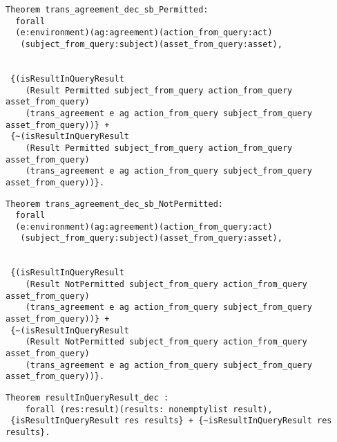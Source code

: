 \begin{lstlisting}
Theorem trans_agreement_dec_sb_Permitted:
  forall
  (e:environment)(ag:agreement)(action_from_query:act)
   (subject_from_query:subject)(asset_from_query:asset),


 {(isResultInQueryResult 
    (Result Permitted subject_from_query action_from_query asset_from_query)
    (trans_agreement e ag action_from_query subject_from_query asset_from_query))} +
 {~(isResultInQueryResult 
    (Result Permitted subject_from_query action_from_query asset_from_query)
    (trans_agreement e ag action_from_query subject_from_query asset_from_query))}.

\end{lstlisting}

\begin{lstlisting}
Theorem trans_agreement_dec_sb_NotPermitted:
  forall
  (e:environment)(ag:agreement)(action_from_query:act)
   (subject_from_query:subject)(asset_from_query:asset),


 {(isResultInQueryResult 
    (Result NotPermitted subject_from_query action_from_query asset_from_query)
    (trans_agreement e ag action_from_query subject_from_query asset_from_query))} +
 {~(isResultInQueryResult 
    (Result NotPermitted subject_from_query action_from_query asset_from_query)
    (trans_agreement e ag action_from_query subject_from_query asset_from_query))}.

\end{lstlisting}


\begin{lstlisting}
Theorem resultInQueryResult_dec :
    forall (res:result)(results: nonemptylist result), 
 {isResultInQueryResult res results} + {~isResultInQueryResult res results}.
\end{lstlisting}


